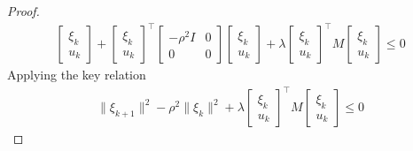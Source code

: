 \documentclass[11pt,a4paper]{article}
\begin{document}
\begin{proof}
\begin{equation}
\begin{aligned}
            \left[\begin{array}{l}
                \xi_{k} \\
                u_{k}
            \end{array}\right] + \left[\begin{array}{l}
                \xi_{k} \\
                u_{k}
            \end{array}\right]^{\top}
            \left[\begin{array}{cc}
                -\rho^2I & 0 \\
                0 & 0
                \end{array}\right]
                \left[\begin{array}{l}
                    \xi_{k} \\
                    u_{k}
                \end{array}\right]+
                \lambda \left[\begin{array}{l}
                    \xi_{k} \\
                    u_{k}
                \end{array}\right]^{\top}
                M
                    \left[\begin{array}{l}
                        \xi_{k} \\
                        u_{k}
                    \end{array}\right]\leq 0
    \end{aligned}
    \nonumber
\end{equation}
Applying the key relation
\begin{equation}
    \begin{aligned}
        \|\xi_{k+1}\|^2-\rho^2\|\xi_k\|^2+\lambda\left[\begin{array}{l}
            \xi_{k} \\
            u_{k}
        \end{array}\right]^{\top}
        M
            \left[\begin{array}{l}
                \xi_{k} \\
                u_{k}
            \end{array}\right]\leq 0
    \end{aligned}
    \nonumber
\end{equation}


\end{proof}
\end{document}
